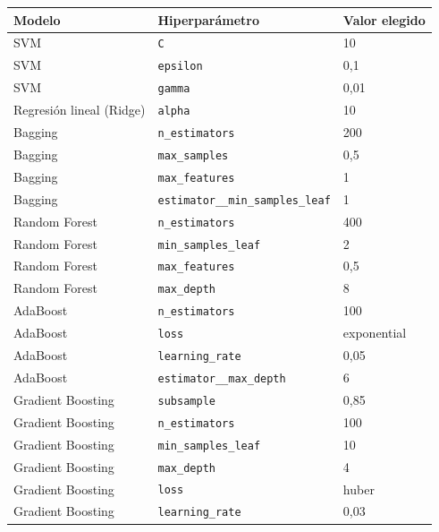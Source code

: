 \begin{tabular}{lll}
\toprule
Modelo & Hiperparámetro & Valor elegido \\
\midrule
SVM & \texttt{C} & 10 \\
SVM & \texttt{epsilon} & 0,1 \\
SVM & \texttt{gamma} & 0,01 \\
Regresión lineal (Ridge) & \texttt{alpha} & 10 \\
Bagging & \texttt{n\_estimators} & 200 \\
Bagging & \texttt{max\_samples} & 0,5 \\
Bagging & \texttt{max\_features} & 1 \\
Bagging & \texttt{estimator\_\_min\_samples\_leaf} & 1 \\
Random Forest & \texttt{n\_estimators} & 400 \\
Random Forest & \texttt{min\_samples\_leaf} & 2 \\
Random Forest & \texttt{max\_features} & 0,5 \\
Random Forest & \texttt{max\_depth} & 8 \\
AdaBoost & \texttt{n\_estimators} & 100 \\
AdaBoost & \texttt{loss} & exponential \\
AdaBoost & \texttt{learning\_rate} & 0,05 \\
AdaBoost & \texttt{estimator\_\_max\_depth} & 6 \\
Gradient Boosting & \texttt{subsample} & 0,85 \\
Gradient Boosting & \texttt{n\_estimators} & 100 \\
Gradient Boosting & \texttt{min\_samples\_leaf} & 10 \\
Gradient Boosting & \texttt{max\_depth} & 4 \\
Gradient Boosting & \texttt{loss} & huber \\
Gradient Boosting & \texttt{learning\_rate} & 0,03 \\
\bottomrule
\end{tabular}

